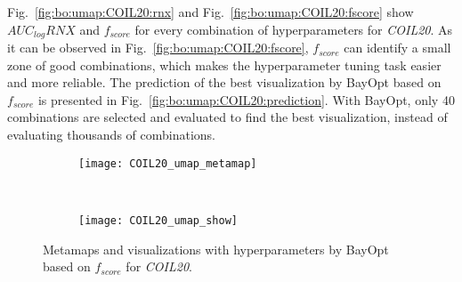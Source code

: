 
Fig.~\ref{fig:bo:umap:COIL20:rnx} and Fig.~\ref{fig:bo:umap:COIL20:fscore} show $AUC_{log}RNX$ and $f_{score}$ for every combination of hyperparameters for \emph{COIL20}.
As it can be observed in Fig.~\ref{fig:bo:umap:COIL20:fscore}, $f_{score}$ can identify a small zone of good combinations, which makes the hyperparameter tuning task easier and more reliable. The prediction of the best visualization by BayOpt based on $f_{score}$ is presented in Fig.~\ref{fig:bo:umap:COIL20:prediction}.
With BayOpt, only 40 combinations are selected and evaluated to find the best visualization, instead of evaluating thousands of combinations.

\begin{figure*}[ht!]
    \centering
    \begin{subfigure}[b]{.8\linewidth}
        \centering
        \texttt{[image: COIL20\_umap\_metamap]}
    \end{subfigure}
    ~
    \begin{subfigure}[b]{.8\linewidth}
        \texttt{[image: COIL20\_umap\_show]}
    \end{subfigure}
    \caption{Metamaps and visualizations with hyperparameters by BayOpt based on $f_{score}$ for \emph{COIL20}.}
    \label{fig:umap:meta:COIL20}
\end{figure*}

